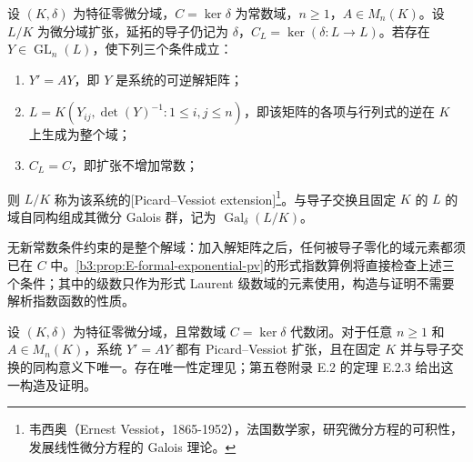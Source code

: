 \begin{definition}\label{b3:def:picard-vessiot-extension}
	设 \((K,\delta)\) 为特征零微分域，\(C=\ker\delta\) 为常数域，\(n\ge1\)，\(A\in M_n(K)\)。设 \(L/K\) 为微分域扩张，延拓的导子仍记为 \(\delta\)，\(C_L=\ker(\delta:L\to L)\)。若存在 \(Y\in\operatorname{GL}_n(L)\)，使下列三个条件成立：
	\begin{enumerate}
		\item \(Y'=AY\)，即 \(Y\) 是系统的可逆解矩阵；
		\item \(L=K(Y_{ij},\det(Y)^{-1}:1\le i,j\le n)\)，即该矩阵的各项与行列式的逆在 \(K\) 上生成为整个域；
		\item \(C_L=C\)，即扩张不增加常数；
	\end{enumerate}
	则 \(L/K\) 称为该系统的[Picard--Vessiot extension]\footnote{韦西奥（Ernest Vessiot，1865-1952），法国数学家，研究微分方程的可积性，发展线性微分方程的 Galois 理论。}。与导子交换且固定 \(K\) 的 \(L\) 的域自同构组成其微分 Galois 群，记为 \(\operatorname{Gal}_\delta(L/K)\)。
\end{definition}

无新常数条件约束的是整个解域：加入解矩阵之后，任何被导子零化的域元素都须已在 \(C\) 中。\cref{b3:prop:E-formal-exponential-pv}的形式指数算例将直接检查上述三个条件；其中的级数只作为形式 Laurent 级数域的元素使用，构造与证明不需要解析指数函数的性质。

\ProseParagraphBreak
设 \((K,\delta)\) 为特征零微分域，且常数域 \(C=\ker\delta\) 代数闭。对于任意 \(n\ge1\) 和 \(A\in M_n(K)\)，系统 \(Y'=AY\) 都有 Picard--Vessiot 扩张，且在固定 \(K\) 并与导子交换的同构意义下唯一。存在唯一性定理见\cite[Propositions 1.20, 1.22]{VanDerPutSinger2003GaloisTheory}；第五卷附录 E.2 的定理 E.2.3 给出这一构造及证明。

